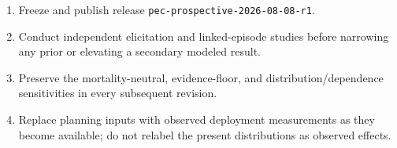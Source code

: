 \documentclass[10pt]{article}
\begin{document}
\begin{enumerate}
\item Freeze and publish release \texttt{pec-prospective-2026-08-08-r1}.
\item Conduct independent elicitation and linked-episode studies before
narrowing any prior or elevating a secondary modeled result.
\item Preserve the mortality-neutral, evidence-floor, and
distribution/dependence sensitivities in every subsequent revision.
\item Replace planning inputs with observed deployment measurements as they
become available; do not relabel the present distributions as observed effects.
\end{enumerate}
\end{document}
